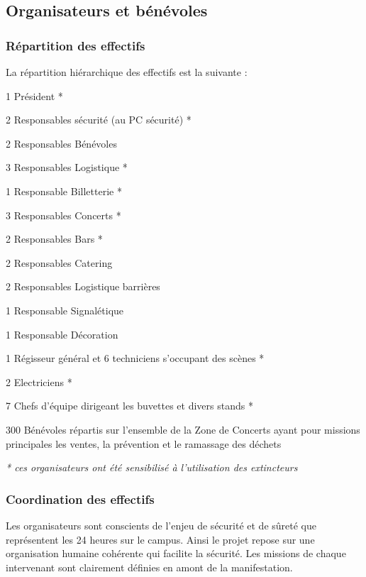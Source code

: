 \documentclass[hidelinks, paper=a4, fontsize=13pt]{report}
\begin{document}
\subsection{Organisateurs et bénévoles}

\subsubsection{Répartition des effectifs}
La répartition hiérarchique des effectifs est la suivante :
\begin{list}{•}{}
	\item 1 Président *
	\item 2 Responsables sécurité (au PC sécurité) *
	\item 2 Responsables Bénévoles
	\item 3 Responsables Logistique *
	\item 1 Responsable Billetterie *
	\item 3 Responsables Concerts *
	\item 2 Responsables Bars *
	\item 2 Responsables Catering
	\item 2 Responsables Logistique barrières
	\item 1 Responsable Signalétique
	\item 1 Responsable Décoration
	\item 1 Régisseur général et 6 techniciens s’occupant des scènes *
	\item 2 Electriciens *
	\item 7 Chefs d’équipe dirigeant les buvettes et divers stands *
	\item 300 Bénévoles répartis sur l’ensemble de la Zone de Concerts ayant pour missions principales les ventes, la prévention et le ramassage des déchets
\end{list}

\textit{* ces organisateurs ont été sensibilisé à l'utilisation des extincteurs}

\subsubsection{Coordination des effectifs}
\label{coordination_effectifs}

Les organisateurs sont conscients de l’enjeu de sécurité et de sûreté que représentent les 24 heures sur le campus. Ainsi le projet repose sur une organisation humaine cohérente qui facilite la sécurité. Les missions de chaque intervenant sont clairement définies en amont de la manifestation.
\end{document}
